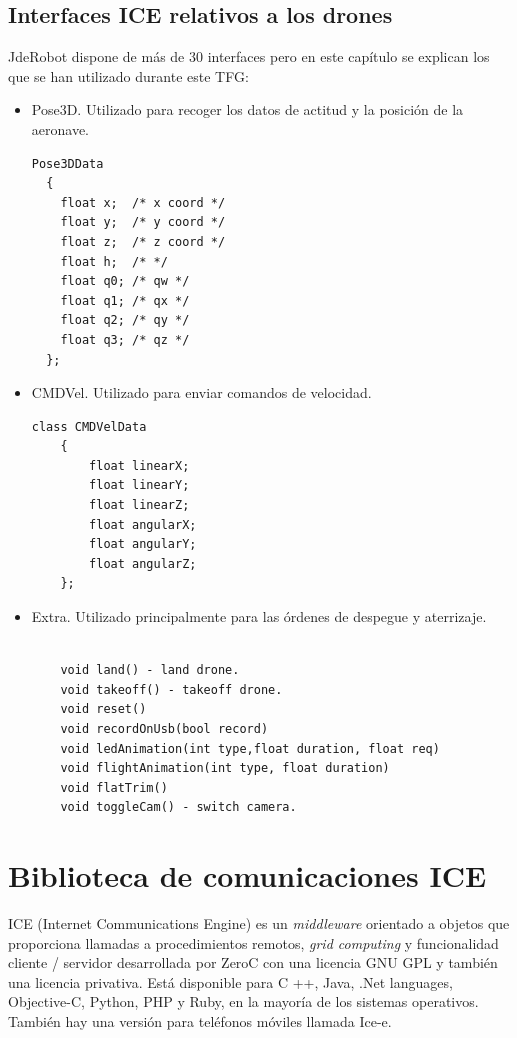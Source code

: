 \subsection{Interfaces ICE relativos a los drones}
JdeRobot dispone de más de 30 interfaces pero en este cap\'itulo se explican los que se han utilizado durante este TFG:
\begin{itemize}
\item Pose3D. Utilizado para recoger los datos de actitud y la posici\'on de la aeronave.
\begin{lstlisting}[frame=single]
Pose3DData
  {
	float x;  /* x coord */
	float y;  /* y coord */
	float z;  /* z coord */
  	float h;  /* */
	float q0; /* qw */
	float q1; /* qx */
	float q2; /* qy */
	float q3; /* qz */
  };
\end{lstlisting}

\item CMDVel. Utilizado para enviar comandos de velocidad.
\begin{lstlisting}[frame=single]
	class CMDVelData
	{
		float linearX;
		float linearY;
		float linearZ;
		float angularX;
		float angularY;
		float angularZ;										
	};

\end{lstlisting}
\item Extra. Utilizado principalmente para las órdenes de despegue y aterrizaje.
\begin{lstlisting}[frame=single]

    void land() - land drone. 
    void takeoff() - takeoff drone. 
    void reset() 
    void recordOnUsb(bool record) 
    void ledAnimation(int type,float duration, float req) 
    void flightAnimation(int type, float duration) 
    void flatTrim() 
    void toggleCam() - switch camera. 
\end{lstlisting}

\end{itemize}

\section{Biblioteca de comunicaciones ICE}
\label{sec:ICE}
ICE\cite{ice} (Internet Communications Engine) es un \textit{middleware}  orientado a objetos que proporciona llamadas a procedimientos remotos, \textit{grid computing} y funcionalidad cliente / servidor desarrollada por ZeroC con una licencia GNU GPL y también una licencia privativa. Está disponible para C ++,
Java, .Net languages, Objective-C, Python, PHP y Ruby, en la mayoría de los sistemas operativos. También hay una versión para teléfonos móviles llamada Ice-e. 

